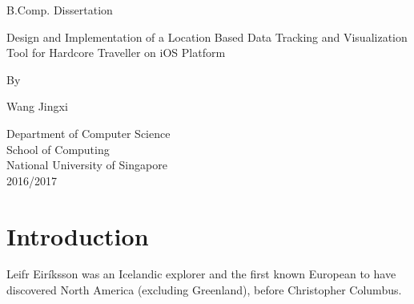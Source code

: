 \documentclass[12pt,a4paper]{report}
\begin{document}
	\begin{titlepage}
		\begin{center}
		
			B.Comp. Dissertation
			
			\vspace*{2cm}
			
			{\LARGE Design and Implementation of a Location Based Data Tracking and Visualization Tool for Hardcore Traveller on iOS Platform}
			
			\vspace{2.5cm}
			
			By\\
			
			\vspace{0.5cm}
			
			Wang Jingxi
			
			\vfill
			
			Department of Computer Science\\
			School of Computing\\
			National University of Singapore\\
			2016/2017
			
		\end{center}
	\end{titlepage}
	
	\tableofcontents

	\newpage

	\section{Introduction}
	Leifr Eiríksson was an Icelandic explorer and the first known European to have discovered North America (excluding Greenland), before Christopher Columbus.
\end{document}
